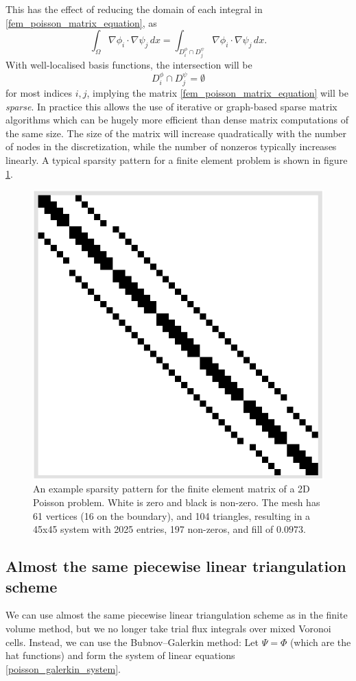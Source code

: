 This has the effect of reducing the domain of each integral in \eqref{fem_poisson_matrix_equation}, as
    $$\int_\Omega \nabla\phi_i \cdot \nabla\psi_j\,dx = \int_{D_i^\phi \cap D_j^\psi} \nabla\phi_i \cdot \nabla\psi_j\,dx. $$
With well-localised basis functions, the intersection will be
    $$D_i^\phi \cap D_j^\psi = \emptyset$$
for most indices $i,j$, implying the matrix \eqref{fem_poisson_matrix_equation} will be \textit{sparse}. In practice this allows
the use of iterative or graph-based sparse matrix algorithms which can be hugely more efficient than dense matrix computations of the same size.
The size of the matrix will increase quadratically with the number of nodes in the discretization, while the number of nonzeros
typically increases linearly.
A typical sparsity pattern for a finite element problem is shown in figure \ref{sparsity_pattern}.

\begin{figure}[H]
    \begin{center}
        \includegraphics[width=0.26\linewidth]{figures/sparsity_pattern_no_text.png}
    \end{center}
    \caption{\scriptsize
        An example sparsity pattern for the finite element matrix of a 2D Poisson problem. White is zero and black is non-zero.
        The mesh has 61 vertices (16 on the boundary), and 104 triangles, resulting in a 45x45 system with 2025 entries, 197 non-zeros, and fill of $0.0973$.
    }
    \label{sparsity_pattern}
\end{figure}

\subsection{Almost the same piecewise linear triangulation scheme}
We can use almost the same piecewise linear triangulation scheme as in the finite volume method, but we no longer
take trial flux integrals over mixed Voronoi cells. Instead, we can use the Bubnov--Galerkin method: Let $\Psi = \Phi$
(which are the hat functions) and form the system of linear equations \eqref{poisson_galerkin_system}.




